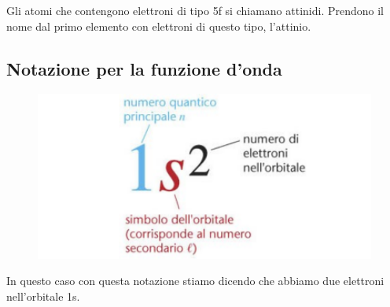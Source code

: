 Gli atomi che contengono elettroni di tipo 5f si chiamano attinidi. Prendono il nome dal primo elemento con elettroni di questo tipo, l'attinio.

\subsection{Notazione per la funzione d'onda}
\begin{figure}[htp]
  \centering
  \includegraphics[width=12cm]{immagini/notazione.png}
\end{figure}
In questo caso con questa notazione stiamo dicendo che abbiamo due elettroni nell'orbitale 1s.


